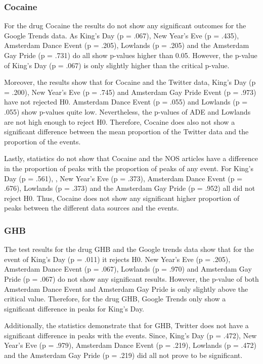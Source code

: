 \subsubsection{Cocaine}

For the drug Cocaine the results do not show any significant outcomes for the Google Trends data. As King’s Day (p = .067), New Year’s Eve (p = .435), Amsterdam Dance Event (p = .205), Lowlands (p = .205) and the Amsterdam Gay Pride (p = .731) do all show p-values higher than 0.05. However, the p-value of King’s Day (p = .067) is only slightly higher than the critical p-value. 

	Moreover, the results show that for Cocaine and the Twitter data, King’s Day (p = .200), New Year’s Eve (p = .745) and Amsterdam Gay Pride Event (p = .973) have not rejected H0.  Amsterdam Dance Event (p = .055) and Lowlands (p = .055) show p-values quite low. Nevertheless, the p-values of ADE and Lowlands are not high enough to reject H0. Therefore, Cocaine does also not show a significant difference between the mean proportion of the Twitter data and the proportion of the events. 

	Lastly, statistics do not show that Cocaine and the NOS articles have a difference in the proportion of peaks with the proportion of peaks of any event. For King’s Day (p = .561), , New Year’s Eve (p = .373), Amsterdam Dance Event (p = .676), Lowlands (p = .373) and the Amsterdam Gay Pride (p = .952) all did not reject H0. Thus, Cocaine does not show any significant higher proportion of peaks between the different data sources and the events.

\subsubsection{GHB}

The test results for the drug GHB and the Google trends data show that for the event of King’s Day (p = .011) it rejects H0. New Year’s Eve (p = .205), Amsterdam Dance Event (p = .067), Lowlands (p = .970) and Amsterdam Gay Pride (p = .067) do not show any significant results. However, the p-value of both Amsterdam Dance Event and Amsterdam Gay Pride is only slightly above the critical value. Therefore, for the drug GHB, Google Trends only show a significant difference in peaks for King’s Day.

Additionally, the statistics demonstrate that for GHB, Twitter does not have a significant difference in peaks with the events. Since, King’s Day (p = .472), New Year’s Eve (p = .979), Amsterdam Dance Event (p = .219), Lowlands (p = .472) and the Amsterdam Gay Pride (p = .219) did all not prove to be significant.

